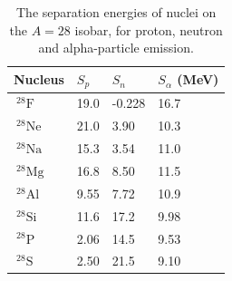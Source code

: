 \begin{table}
\begin{center}
\begin{tabular}{l|lll}
Nucleus & $S_p$ & $S_n$ & $S_\alpha$ (MeV)\\\hline\hline
$~^{28}\mathrm{F}$ & 19.0 & -0.228 & 16.7 \\\hline
$~^{28}\mathrm{Ne}$ & 21.0 & 3.90 & 10.3 \\\hline
$~^{28}\mathrm{Na}$ & 15.3 & 3.54 & 11.0 \\\hline
$~^{28}\mathrm{Mg}$ & 16.8 & 8.50 & 11.5 \\\hline
$~^{28}\mathrm{Al}$ & 9.55 & 7.72 & 10.9 \\\hline
$~^{28}\mathrm{Si}$ & 11.6 & 17.2 & 9.98 \\\hline
$~^{28}\mathrm{P}$ & 2.06 & 14.5 & 9.53 \\\hline
$~^{28}\mathrm{S}$ & 2.50 & 21.5 & 9.10 \\\hline
\end{tabular}
\end{center}
\caption{\label{tab:sep} The separation energies of nuclei on the $A=28$ isobar, for proton, neutron and alpha-particle emission.}
\end{table}

